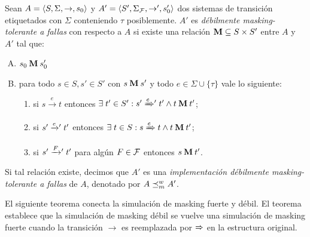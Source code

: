 \begin{definition} \label{def:weak_mask}
  Sean $A =\langle S, \Sigma, \rightarrow, s_0 \rangle$ y $A' =\langle S',
  \Sigma_{\mathcal{F}}, \rightarrow', s'_0 \rangle$ dos sistemas de transición etiquetados con $\Sigma$
  conteniendo $\tau$ posiblemente.  $A'$ es \emph{débilmente masking-tolerante a fallas}
  con respecto a $A$ si existe una relación $\mathbin{\mathbf{M}} \subseteq S
  \times S'$ entre $A$ y $A'$ tal que:

\begin{enumerate}[(A)]
  \item $s_0 \mathbin{\mathbf{M}} s'_0$
  \item para todo $s \in S, s' \in S'$ con $s \mathbin{\mathbf{M}} s'$ y todo $e \in \Sigma \cup \{\tau\}$ vale lo siguiente:

  \begin{enumerate}[(1)]
    \item si $s \xrightarrow{e} t$ entonces 
    $\exists\; t' \in S': s' \mathrel{{\xRightarrow[]{e}}{}'} t' 
    \wedge t \mathbin{\mathbf{M}} t'$;

      \item si $s' \mathrel{{\xrightarrow[]{e}}{}'} t'$ entonces  
      $\exists \; t \in S: s \xRightarrow{e} t  
      \wedge t \mathbin{\mathbf{M}} t'$;

      \item si $s' \mathrel{{\xrightarrow[]{F}}{}'} t'$ para algún $F \in \mathcal{F}$ entonces 
      $s \mathbin{\mathbf{M}} t'$.
  \end{enumerate}
\end{enumerate}

%
Si tal relación existe, decimos que $A'$ es una \emph{implementación débilmente masking-tolerante a fallas} de
$A$, denotado por $A \preceq^w_{m} A'$.
\end{definition}

El siguiente teorema conecta la simulación de masking fuerte y débil. El teorema establece que la simulación de masking débil se vuelve una simulación de masking fuerte cuando la transición $\xrightarrow{}$ es reemplazada por $\xRightarrow{}$ en la estructura original.

